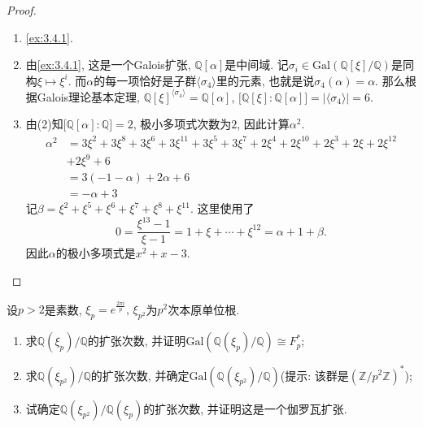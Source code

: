 \begin{proof}
    \begin{enumerate}[(1)]
        \item \ref{ex:3.4.1}.
        \item 由\ref{ex:3.4.1}, 这是一个Galois扩张, $\mathbb{Q}[\alpha]$是中间域. 记$\sigma_i \in \mathrm{Gal}\left(\mathbb{Q}[\xi]/\mathbb{Q}\right)$是同构$\xi \mapsto \xi^i$. 而$\alpha$的每一项恰好是子群$\langle \sigma_4 \rangle$里的元素, 也就是说$\sigma_4(\alpha) = \alpha$. 那么根据Galois理论基本定理, $\mathbb{Q}[\xi]^{\langle \sigma_4 \rangle} = \mathbb{Q}[\alpha]$, $\bigl[\mathbb{Q}[\xi]:\mathbb{Q}[\alpha]\bigr] = |\langle \sigma_4 \rangle| = 6$.
        \item 由(2)知$\bigl[\mathbb{Q}[\alpha]:\mathbb{Q}\bigr] = 2$, 极小多项式次数为$2$, 因此计算$\alpha^2$.
        \[
        \begin{aligned}
            \alpha^2 &= 3\xi^2 + 3\xi^8 + 3\xi^6 + 3\xi^{11} + 3\xi^5 + 3\xi^7 + 2\xi^4 + 2\xi^{10} + 2\xi^3 + 2\xi + 2\xi^{12}\\
            &+ 2\xi^9 + 6\\
            &= 3(-1 - \alpha) + 2\alpha + 6\\
            &= -\alpha + 3
        \end{aligned}
        \]
        记$\beta = \xi^2 + \xi^5 + \xi^6 + \xi^7 + \xi^8 + \xi^{11}$. 这里使用了
        \[
            0 = \frac{\xi^{13} - 1}{\xi - 1}  = 1 + \xi + \cdots + \xi^{12} = \alpha + 1 + \beta.
        \]
        因此$\alpha$的极小多项式是$x^2 + x - 3$.
    \end{enumerate}
\end{proof}

\begin{problem}\label{ex:4.4.4}
    设$p > 2$是素数, $\xi_p = e^{\frac{2\pi i}p},\, \xi_{p^2}$为$p^2$次本原单位根.
    \begin{enumerate}[(1)]
        \item 求$\mathbb{Q}(\xi_p)/\mathbb{Q}$的扩张次数, 并证明$\mathrm{Gal}(\mathbb{Q}(\xi_p)/\mathbb{Q}) \cong F_p^*$;
        \item 求$\mathbb{Q}(\xi_{p^2})/\mathbb{Q}$的扩张次数, 并确定$\mathrm{Gal}(\mathbb{Q}(\xi_{p^2})/\mathbb{Q})$(提示: 该群是$(\mathbb{Z}/p^2\mathbb{Z})^*$);
        \item 试确定$\mathbb{Q}(\xi_{p^2})/\mathbb{Q}(\xi_p)$的扩张次数, 并证明这是一个伽罗瓦扩张.
    \end{enumerate}
\end{problem}

